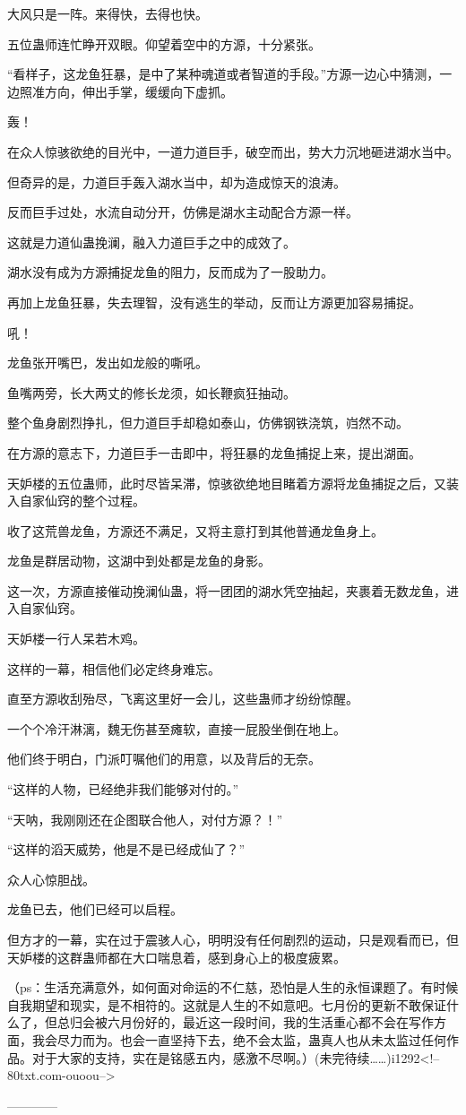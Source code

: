 \begin{this_body}
大风只是一阵。来得快，去得也快。

五位蛊师连忙睁开双眼。仰望着空中的方源，十分紧张。

“看样子，这龙鱼狂暴，是中了某种魂道或者智道的手段。”方源一边心中猜测，一边照准方向，伸出手掌，缓缓向下虚抓。

轰！

在众人惊骇欲绝的目光中，一道力道巨手，破空而出，势大力沉地砸进湖水当中。

但奇异的是，力道巨手轰入湖水当中，却为造成惊天的浪涛。

反而巨手过处，水流自动分开，仿佛是湖水主动配合方源一样。

这就是力道仙蛊挽澜，融入力道巨手之中的成效了。

湖水没有成为方源捕捉龙鱼的阻力，反而成为了一股助力。

再加上龙鱼狂暴，失去理智，没有逃生的举动，反而让方源更加容易捕捉。

吼！

龙鱼张开嘴巴，发出如龙般的嘶吼。

鱼嘴两旁，长大两丈的修长龙须，如长鞭疯狂抽动。

整个鱼身剧烈挣扎，但力道巨手却稳如泰山，仿佛钢铁浇筑，岿然不动。

在方源的意志下，力道巨手一击即中，将狂暴的龙鱼捕捉上来，提出湖面。

天妒楼的五位蛊师，此时尽皆呆滞，惊骇欲绝地目睹着方源将龙鱼捕捉之后，又装入自家仙窍的整个过程。

收了这荒兽龙鱼，方源还不满足，又将主意打到其他普通龙鱼身上。

龙鱼是群居动物，这湖中到处都是龙鱼的身影。

这一次，方源直接催动挽澜仙蛊，将一团团的湖水凭空抽起，夹裹着无数龙鱼，进入自家仙窍。

天妒楼一行人呆若木鸡。

这样的一幕，相信他们必定终身难忘。

直至方源收刮殆尽，飞离这里好一会儿，这些蛊师才纷纷惊醒。

一个个冷汗淋漓，魏无伤甚至瘫软，直接一屁股坐倒在地上。

他们终于明白，门派叮嘱他们的用意，以及背后的无奈。

“这样的人物，已经绝非我们能够对付的。”

“天呐，我刚刚还在企图联合他人，对付方源？！”

“这样的滔天威势，他是不是已经成仙了？”

众人心惊胆战。

龙鱼已去，他们已经可以启程。

但方才的一幕，实在过于震骇人心，明明没有任何剧烈的运动，只是观看而已，但天妒楼的这群蛊师都在大口喘息着，感到身心上的极度疲累。

（ps：生活充满意外，如何面对命运的不仁慈，恐怕是人生的永恒课题了。有时候自我期望和现实，是不相符的。这就是人生的不如意吧。七月份的更新不敢保证什么了，但总归会被六月份好的，最近这一段时间，我的生活重心都不会在写作方面，我会尽力而为。也会一直坚持下去，绝不会太监，蛊真人也从未太监过任何作品。对于大家的支持，实在是铭感五内，感激不尽啊。）(未完待续……)i1292<!--80txt.com-ouoou-->

------------

\end{this_body}

